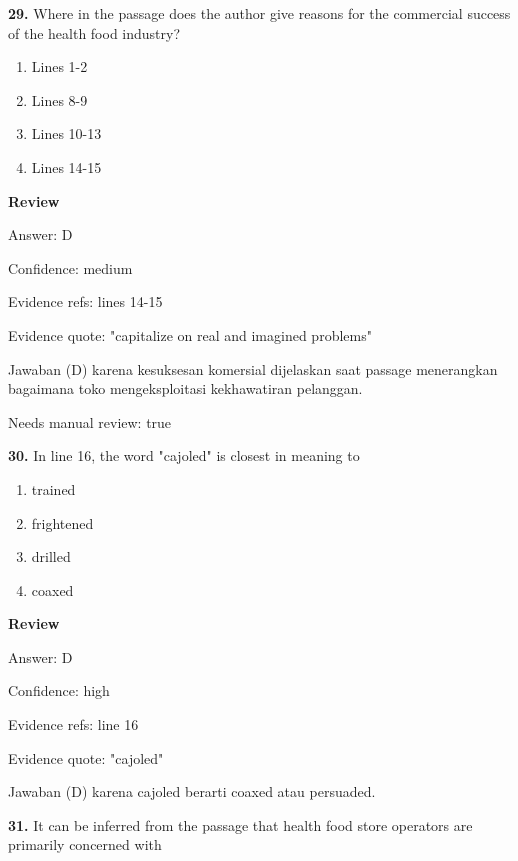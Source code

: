 \documentclass[12pt]{article}
\begin{document}
\endgroup
\par
\vspace{0.25\baselineskip}
\noindent\textbf{29.} Where in the passage does the author give reasons for the commercial success of the health food industry?
\begin{enumerate}[label=(\Alph*),leftmargin=*,itemsep=0.2em]
\item Lines 1-2
\item Lines 8-9
\item Lines 10-13
\item Lines 14-15
\end{enumerate}
\par
\begingroup
\setlength{\parskip}{0pt}
\setlength{\parindent}{0pt}
\textbf{Review}\par
Answer: D\par
Confidence: medium\par
Evidence refs: lines 14-15\par
Evidence quote: "capitalize on real and imagined problems"\par
Jawaban (D) karena kesuksesan komersial dijelaskan saat passage menerangkan bagaimana toko mengeksploitasi kekhawatiran pelanggan.\par
Needs manual review: true\par
\endgroup
\par
\vspace{0.25\baselineskip}
\noindent\textbf{30.} In line 16, the word "cajoled" is closest in meaning to
\begin{enumerate}[label=(\Alph*),leftmargin=*,itemsep=0.2em]
\item trained
\item frightened
\item drilled
\item coaxed
\end{enumerate}
\par
\begingroup
\setlength{\parskip}{0pt}
\setlength{\parindent}{0pt}
\textbf{Review}\par
Answer: D\par
Confidence: high\par
Evidence refs: line 16\par
Evidence quote: "cajoled"\par
Jawaban (D) karena cajoled berarti coaxed atau persuaded.\par
\endgroup
\par
\vspace{0.25\baselineskip}
\noindent\textbf{31.} It can be inferred from the passage that health food store operators are primarily concerned with
\end{document}
